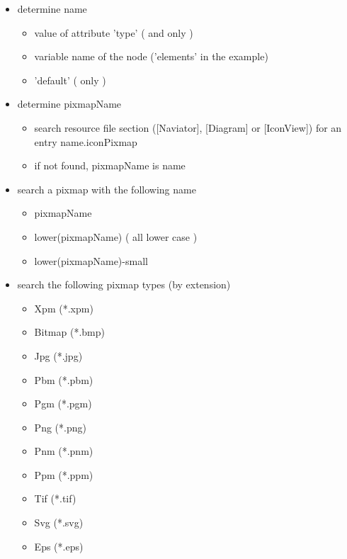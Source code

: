 \begin{itemize}
\item determine name
  \begin{itemize}
  \item value of \STRING{} attribute 'type' ( \DIAGRAM{} and \ICONVIEW{} only )
  \item variable name of the node ('elements' in the \ICONVIEW{} example)
  \item 'default' ( \DIAGRAM{} only )
  \end{itemize}

\item determine pixmapName
  \begin{itemize}
  \item search resource file section ([Naviator], [Diagram] or [IconView])
        for an entry name.iconPixmap
  \item if not found, pixmapName is name
  \end{itemize}

\item search a pixmap with the following name
  \begin{itemize}
  \item pixmapName
  \item lower(pixmapName) ( all lower case )
  \item lower(pixmapName)-small
  \end{itemize}

\item search the following pixmap types (by extension)
  \begin{itemize}
  \item Xpm (*.xpm)
  \item Bitmap (*.bmp)
  \item Jpg (*.jpg)
  \item Pbm (*.pbm)
  \item Pgm (*.pgm)
  \item Png (*.png)
  \item Pnm (*.pnm)
  \item Ppm (*.ppm)
  \item Tif (*.tif)
  \item Svg (*.svg)
  \item Eps (*.eps)
  \end{itemize}


\end{itemize}
